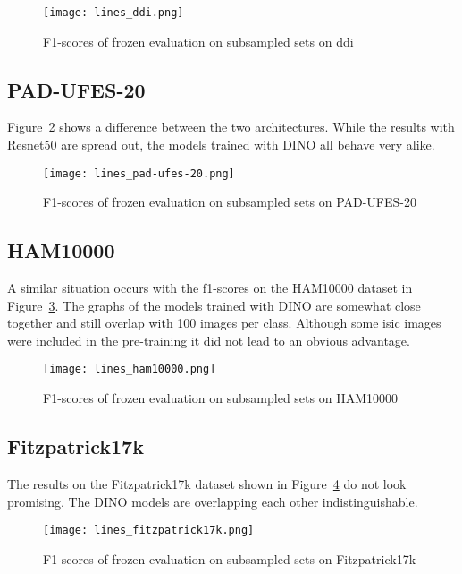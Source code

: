 \begin{figure}[H]
    \begin{center}
    \texttt{[image: lines\_ddi.png]}
    \caption{F1-scores of frozen evaluation on subsampled sets on \gls{ddi}}\label{fig:lines_ddi}
    \end{center}
\end{figure}

\subsection{PAD-UFES-20}
Figure~\ref{fig:lines_pad-ufes-20} shows a difference between the two architectures. 
While the results with Resnet50 are spread out, the models trained with DINO all behave very alike.
\begin{figure}[H]
    \begin{center}
    \texttt{[image: lines\_pad-ufes-20.png]}
    \caption{F1-scores of frozen evaluation on subsampled sets on PAD-UFES-20}\label{fig:lines_pad-ufes-20}
    \end{center}
\end{figure}

\subsection{HAM10000}
A similar situation occurs with the f1-scores on the HAM10000 dataset in Figure~\ref{fig:lines_ham10000}.
The graphs of the models trained with DINO are somewhat close together and still overlap with 100 images per class.
Although some \gls{isic} images were included in the pre-training it did not lead to an obvious advantage.
\begin{figure}[H]
    \begin{center}
    \texttt{[image: lines\_ham10000.png]}
    \caption{F1-scores of frozen evaluation on subsampled sets on HAM10000}\label{fig:lines_ham10000}
    \end{center}
\end{figure}

\subsection{Fitzpatrick17k}
The results on the Fitzpatrick17k dataset shown in Figure~\ref{fig:lines_fitzpatrick17k} do not look promising.
The DINO models are overlapping each other indistinguishable.
\begin{figure}[H]
    \begin{center}
    \texttt{[image: lines\_fitzpatrick17k.png]}
    \caption{F1-scores of frozen evaluation on subsampled sets on Fitzpatrick17k}\label{fig:lines_fitzpatrick17k}
    \end{center}
\end{figure}


